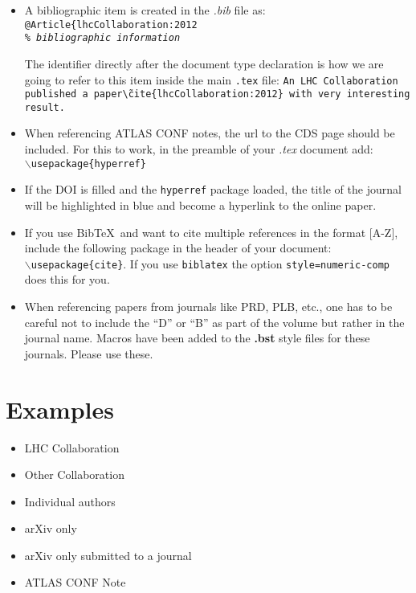 \documentclass[UKenglish]{latex/atlasdoc}
\newcommand*{\BibTeX}{Bib\TeX}
\begin{document}
\begin{itemize}
\item A bibliographic item is created in the \emph{.bib} file as: \\
	\texttt{@Article\{lhcCollaboration:2012 \\ \emph{\% bibliographic information}}
	
	The identifier directly after the document type declaration is how we are going to refer to this item inside the main \texttt{.tex} file:
	\texttt{An LHC Collaboration published a paper\~ \textbackslash cite\{lhcCollaboration:2012\}
	with very interesting result.}
\item When referencing ATLAS CONF notes, the url to the CDS page should be included. For this to work, in the preamble of your \emph{.tex} document add: \\
	\texttt{$\backslash$usepackage\{hyperref\}}
\item If the DOI is filled and the \texttt{hyperref} package loaded, the title of the journal will be highlighted in blue and become a hyperlink to the online paper.
\item If you use \BibTeX\ and want to cite multiple references in the format [A-Z], include the following package in the 	header of your document: \\
	\texttt{$\backslash$usepackage\{cite\}}.
	If you use \texttt{biblatex} the option \texttt{style=numeric-comp} does this for you.
\item When referencing papers from journals like PRD, PLB, etc.,
	one has to be careful not to include the ``D'' or ``B'' as part of the volume but rather in the journal name. 
	Macros have been added to the \textbf{.bst} style files for these journals. Please use these.
\end{itemize}


\section{Examples}

\begin{itemize}
	\item LHC Collaboration~\cite{lhcCollaboration:2012}
	\item Other Collaboration~\cite{otherCollaboration:2007}
	\item Individual authors~\cite{authors:2008}
	\item arXiv only~\cite{arxivOnly:2009}
	\item arXiv only submitted to a journal~\cite{arxivSub:2011}
	\item ATLAS CONF Note~\cite{atlasConf:2012} 
\end{itemize}
\end{document}
